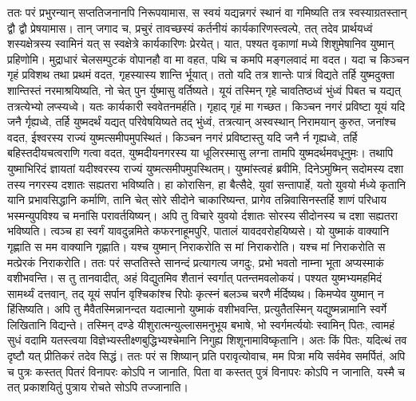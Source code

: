 \adhyAya
{}
\vakya ततः परं प्रभुरन्यान् सप्ततिजनानपि निरूपयामास, स स्वयं यद्यन्नगरं स्थानं वा गमिष्यति तत्र स्वस्याग्रतस्तान् द्वौ द्वौ प्रेषयामास।
\vakya तान् जगाद च, प्रचुरं तावच्छस्यं कर्तनीयं कार्यकारिणस्त्वल्पे, तत् तदेव प्रार्थयध्वं शस्यक्षेत्रस्य स्वामिनं यत् स स्वक्षेत्रे कार्यकारिणः प्रेरयेत्।
\vakya यात, पश्यत वृकाणां मध्ये शिशुमेषानिव युष्मान् प्रहिणोमि।
\vakya मुद्राधारं चेलसम्पुटकं वोपानहौ वा मा वहत, पथि च कमपि मङ्गलवादं मा वदत।
\vakya यदा च किञ्चन गृहं प्रविशथ तथा प्रथमं वदत, गृहस्यास्य शान्ति र्भूयात्।
\vakya ततो यदि तत्र शान्तेः पात्रं विद्यते तर्हि युष्मदुक्ता शान्तिस्तं नरमाश्रयिष्यति, नो चेत् पुन र्युष्मासु वर्तिष्यते।
\vakya यूयं तस्मिन् गृहे चावतिष्ठध्वं भुंध्वं पिबत च यद्यत् तत्रत्येभ्यो लप्स्यध्वे। यतः कार्यकारी स्ववेतनमर्हति। गृहाद् गृहं मा गच्छत।
\vakya किञ्चन नगरं प्रविष्टा यूयं यदि जनै र्गृह्यध्वे, तर्हि युष्मदर्थं यद्यत् परिवेषयिष्यते तद् भुंध्वं,
\vakya तत्रत्यान् अस्वस्थान् निरामयान् कुरुत, जनांश्च वदत, ईश्वरस्य राज्यं युष्मत्समीपमुपस्थितं।
\vakya किञ्चन नगरं प्रविष्टास्तु यदि जनै र्न गृह्यध्वे, तर्हि बहिस्तदीयचत्वराणि गत्वा वदत,
\vakya युष्मदीयनगरस्य या धूलिरस्मासु लग्ना तामपि युष्मदर्थमवधूनुमः। तथापि युष्माभिरिदं ज्ञायतां यदीश्वरस्य राज्यं युष्मत्समीपमुपस्थितम्।
\vakya युष्मांस्त्वहं ब्रवीमि, दिनेऽमुष्मिन् सदोमस्य दशा तस्य नगरस्य दशातः सह्यतरा भविष्यति।
\vakya हा कोरासिन, हा बैत्सैदे, युवां सन्तापार्हे, यतो युवयो र्मध्ये कृतानि यानि प्रभावसिद्धानि कर्माणि, तानि चेत् सोरे सीदोने चाकारिष्यन्त, प्रागेव तन्निवासिनस्तर्हि शाणं परिधाय भस्मन्युपविश्य च मनांसि परावर्तयिष्यन्।
\vakya अपि तु विचारे युवयो र्दशातः सोरस्य सीदोनस्य च दशा सह्यतरा भविष्यति।
\vakya त्वञ्च हा स्वर्गं यावदुन्नमिते कफरनाहूमपुरि, पातालं यावदवरोहयिष्यसे।
\vakya यो युष्माकं वाक्यानि गृह्णाति स मम वाक्यानि गृह्णाति। यश्च युष्मान् निराकरोति स मां निराकरोति। यश्च मां निराकरोति स मत्प्रेरकं निराकरोति।
\vakya ततः परं सप्ततिस्ते सानन्दं प्रत्यागत्य जगदुः, प्रभो भवतो नाम्ना भूता अप्यस्माकं वशीभवन्ति।
\vakya स तु तानवादीत्, अहं विद्युतमिव शैतानं स्वर्गात् पतन्तमवलोकयं।
\vakya पश्यत युष्मभ्यमहमिदं सामर्थ्यं दत्तवान्, तद् यूयं सर्पान वृश्चिकांश्च रिपोः कृत्स्नं बलञ्च चरणै र्मर्दिष्यथ।
\vakya किमप्येव युष्मान् न हिंसिष्यति। अपि तु मैवैतस्मिन्नानन्दत यदात्मानो युष्माकं वशीभवन्ति, प्रत्युतैतस्मिन् यद्युष्मन्नामानि स्वर्गे लिखितानि विद्यन्ते।
\vakya तस्मिन् दण्डे यीशुरात्मन्युल्लासमनुभूय बभाषे, भो स्वर्गमर्त्ययोः स्वामिन् पितः, त्वामहं सुधं वदामि यतस्त्वया विज्ञेभ्यस्तीक्ष्णबुद्धिभ्यश्चेमानि निगुह्य शिशूनामाविष्कृतानि। अतः किं पितः, यदित्थं तव दृष्टौ यत् प्रीतिकरं तदेव सिद्धं।
\vakya ततः परं स शिष्यान् प्रति परावृत्योवाच, मम पित्रा मयि सर्वमेव समर्पितं, अपि च पुत्रः कस्तत् पितरं विनापरः कोऽपि न जानाति, पिता वा कस्तत् पुत्रं विनापरः कोऽपि न जानाति, यस्मै च तत् प्रकाशयितुं पुत्राय रोचते सोऽपि तज्जानाति।
